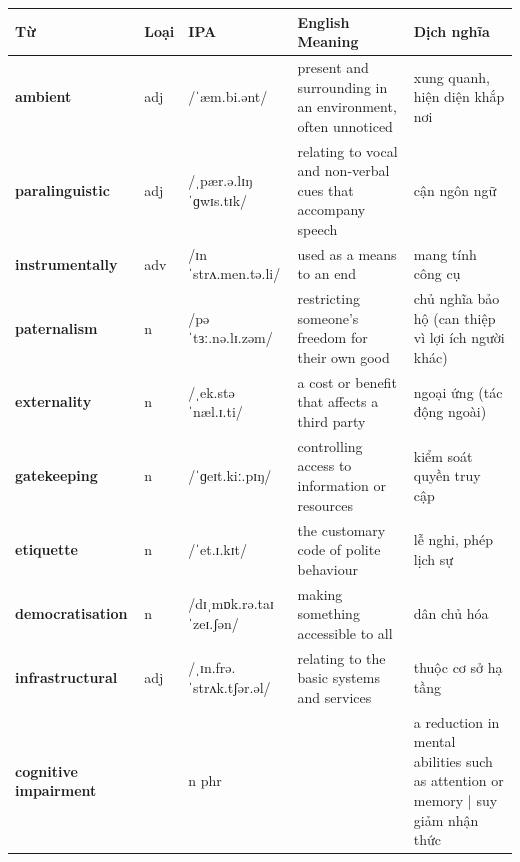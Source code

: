 \vspace{0.8em}
\begin{center}
\renewcommand{\arraystretch}{1.65}
\begin{tabularx}{\textwidth}{|V{0.22\textwidth}|C{0.07\textwidth}|I{0.20\textwidth}|Y|V{0.18\textwidth}|}
\hline
{}
\textbf{Từ} & \textbf{Loại} & \textbf{IPA} & \textbf{English Meaning} & \textbf{Dịch nghĩa} \\
\hline
\textbf{ambient} & adj & /ˈæm.bi.ənt/ & present and surrounding in an environment, often unnoticed & xung quanh, hiện diện khắp nơi \\ \hline
\textbf{paralinguistic} & adj & /ˌpær.ə.lɪŋˈɡwɪs.tɪk/ & relating to vocal and non-verbal cues that accompany speech & cận ngôn ngữ \\ \hline
\textbf{instrumentally} & adv & /ɪnˈstrʌ.men.tə.li/ & used as a means to an end & mang tính công cụ \\ \hline
\textbf{paternalism} & n & /pəˈtɜː.nə.lɪ.zəm/ & restricting someone's freedom for their own good & chủ nghĩa bảo hộ (can thiệp vì lợi ích người khác) \\ \hline
\textbf{externality} & n & /ˌek.stəˈnæl.ɪ.ti/ & a cost or benefit that affects a third party & ngoại ứng (tác động ngoài) \\ \hline
\textbf{gatekeeping} & n & /ˈɡeɪt.kiː.pɪŋ/ & controlling access to information or resources & kiểm soát quyền truy cập \\ \hline
\textbf{etiquette} & n & /ˈet.ɪ.kɪt/ & the customary code of polite behaviour & lễ nghi, phép lịch sự \\ \hline
\textbf{democratisation} & n & /dɪˌmɒk.rə.taɪˈzeɪ.ʃən/ & making something accessible to all & dân chủ hóa \\ \hline
\textbf{infrastructural} & adj & /ˌɪn.frə.ˈstrʌk.tʃər.əl/ & relating to the basic systems and services & thuộc cơ sở hạ tầng \\ \hline
\textbf{cognitive impairment} & & n phr & & a reduction in mental abilities such as attention or memory | suy giảm nhận thức \\ \hline
\end{tabularx}
\end{center}

\newpage

